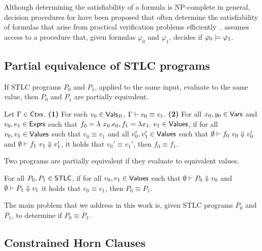 Although determining the satisfiability of a \lia formula is
NP-complete in general, decision procedures for \lia have been
proposed that often determine the satisfiability of formulas that
arise from practical verification problems
efficiently~\cite{demoura08}.
%
\sys assumes access to a procedure that, given \lia formulas
$\varphi_0$ and $\varphi_1$, decides if $\varphi_0 \models
\varphi_1$.

\subsection{Partial equivalence of STLC programs}
\label{sec:peq}
%
%
If STLC programs $P_0$ and $P_1$, applied to the same input, evaluate
to the same value, then $P_0$ and $P_1$ are partially equivalent.
%
\begin{defn}
  \label{defn:val-equiv}
  Let $\Gamma \in \mathsf{Ctxs}$.
  \textbf{(1)} For each $v_0 \in \mathsf{Vals}_B$, $\Gamma \vdash
  v_0 \equiv v_1$.
  \textbf{(2)} For all $x_0, y_0 \in \mathsf{Vars}$ and $e_0, e_1 \in \mathsf{Exprs}$
  such that $f_0 = \lambda\ x_0. e_0, f_1 = \lambda x_1.\ e_1 \in
  \mathsf{Values}$, if for all $v_0, v_1 \in \mathsf{Values}$ such that $v_0 \equiv
  v_1$ and %
  all $v_0', v_1' \in \mathsf{Values}$ such that $\emptyset \vdash f_0\ v_0
  \Downarrow v_0'$ and $\emptyset \vdash f_1\ v_1 \Downarrow v_1'$, it
  holds that $v_0' \equiv v_1'$, then %
  $f_0 \equiv f_1$.
\end{defn}

%
Two programs are partially equivalent if they evaluate to equivalent
values.
%
\begin{defn}
  \label{defn:prog-equiv}
  For all $P_0, P_1 \in \mathsf{STLC}$, if for all $v_0, v_1 \in \mathsf{Values}$ such
  that $\emptyset \vdash P_0 \Downarrow v_0$ and $\emptyset \vdash
  P_1 \Downarrow v_1$ it holds that $v_0 \equiv v_1$, then $P_0 \equiv
  P_1$.
\end{defn}
%
The main problem that we address in this work is, given STLC programs
$P_0$ and $P_1$, to determine if $P_0 \equiv P_1$.

\subsection{Constrained Horn Clauses}
\label{sec:chcs}

